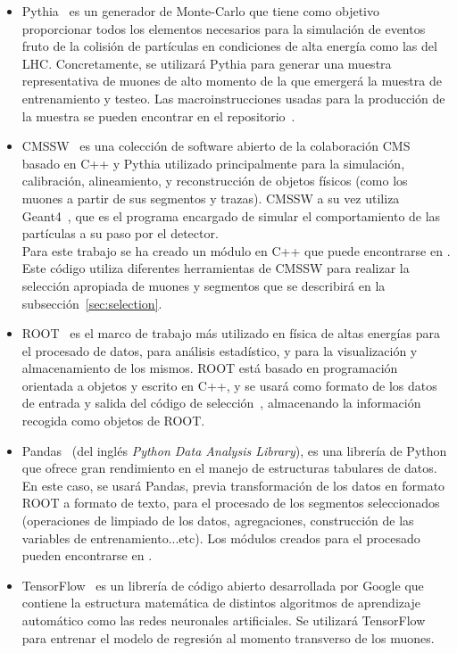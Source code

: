 \begin{itemize}

\item Pythia~\cite{Sjstrand2008ABI} es un generador de Monte-Carlo que tiene como objetivo proporcionar todos los elementos necesarios para la simulaci\'on de eventos fruto de la colisi\'on de part\'iculas en condiciones de alta energ\'ia como las del LHC. Concretamente, se utilizar\'a Pythia para generar una muestra representativa de muones de alto momento de la que emerger\'a la muestra de entrenamiento y testeo. Las macroinstrucciones usadas para la producci\'on de la muestra se pueden encontrar en el repositorio~\cite{generator}.

\item CMSSW~\cite{cmssw} es una colecci\'on de software abierto de la colaboraci\'on CMS basado en C++ y Pythia utilizado principalmente para la simulaci\'on, calibraci\'on, alineamiento, y reconstrucci\'on de objetos f\'isicos (como los muones a partir de sus segmentos y trazas). CMSSW a su vez utiliza Geant4~\cite{Agostinelli:2002hh}, que es el programa encargado de simular el comportamiento de las partículas a su paso por el detector. \\
Para este trabajo se ha creado un m\'odulo en C++ que puede encontrarse en \cite{analyzer}. Este c\'odigo utiliza diferentes herramientas de CMSSW para realizar la selecci\'on apropiada de muones y segmentos que se describir\'a en la subsecci\'on~\ref{sec:selection}. 

\item ROOT~\cite{root} es el marco de trabajo m\'as utilizado en f\'isica de altas energ\'ias para el procesado de datos, para an\'alisis estad\'istico, y para la visualizaci\'on y almacenamiento de los mismos. ROOT est\'a basado en programaci\'on orientada a objetos y escrito en C++, y se usar\'a como formato de los datos de entrada y salida del c\'odigo de selecci\'on~\cite{analyzer}, almacenando la informaci\'on recogida como objetos de ROOT.

\item Pandas~\cite{mckinney-proc-scipy-2010} (del ingl\'es \textit{Python Data Analysis Library}), es una librer\'ia de Python que ofrece gran rendimiento en el manejo de estructuras tabulares de datos. En este caso, se usar\'a Pandas, previa transformaci\'on de los datos en formato ROOT a formato de texto, para el procesado de los segmentos seleccionados (operaciones de limpiado de los datos, agregaciones, construcci\'on de las variables de entrenamiento...etc). Los m\'odulos creados para el procesado pueden encontrarse en \cite{processor}.

\item TensorFlow~\cite{tensorflow2015-whitepaper} es un librer\'ia de c\'odigo abierto desarrollada por Google que contiene la estructura matem\'atica de distintos algoritmos de aprendizaje autom\'atico como las redes neuronales artificiales. Se utilizar\'a TensorFlow para entrenar el modelo de regresi\'on al momento transverso de los muones.

\end{itemize}


